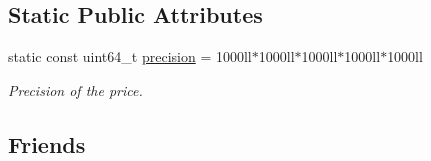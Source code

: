 \subsection*{Static Public Attributes}
\begin{DoxyCompactItemize}
\item 
static const uint64\+\_\+t \mbox{\hyperlink{structaacio_1_1price_a8e52f70f4c5ab8807c6dd56acece363c}{precision}} = 1000ll$\ast$1000ll$\ast$1000ll$\ast$1000ll$\ast$1000ll
\begin{DoxyCompactList}\small\item\em Precision of the price. \end{DoxyCompactList}\end{DoxyCompactItemize}
\subsection*{Friends}
